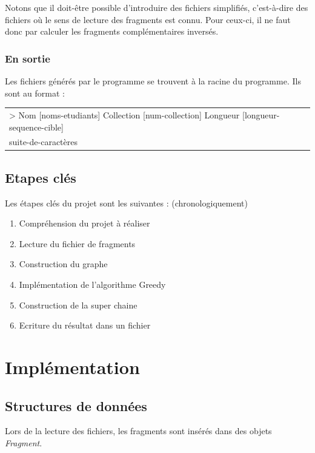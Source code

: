 \documentclass[12pt,a4paper,final]{article}
\begin{document}
Notons que il doit-être possible d'introduire des fichiers simplifiés, c'est-à-dire des fichiers où le sens de lecture des fragments est connu. Pour ceux-ci, il ne faut donc par calculer les fragments complémentaires inversés.

\subsubsection{En sortie}
Les fichiers générés par le programme se trouvent à la racine du programme. Ils sont au format : 

\begin{table}[!ht]
\centering
\begin{tabular}{|l|}
	\hline
	> Nom [noms-etudiants] Collection [num-collection] Longueur [longueur-sequence-cible] \\
	suite-de-caractères\\
	\hline
\end{tabular}
\end{table}

\newpage
\subsection{Etapes clés}
Les étapes clés du projet sont les suivantes : (chronologiquement)
\begin{enumerate}
\item Compréhension du projet à réaliser
\item Lecture du fichier de fragments
\item Construction du graphe
\item Implémentation de l'algorithme Greedy 
\item Construction de la super chaine 
\item Ecriture du résultat dans un fichier
\end{enumerate}

\newpage
\section{Implémentation}
\subsection{Structures de données}

Lors de la lecture des fichiers, les fragments sont insérés dans des objets \textit{Fragment}.\medskip
\end{document}
